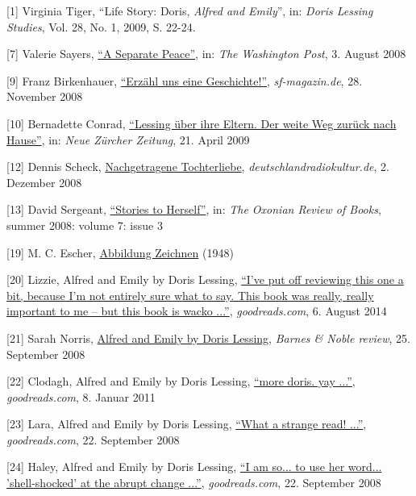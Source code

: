\documentclass[fontsize=12pt]{scrartcl}
\begin{document}
{\tiny[1] Virginia Tiger, "`Life Story: Doris, \textit{Alfred and Emily}"', in: \textit{Doris Lessing Studies}, Vol. 28, No. 1, 2009, S. 22-24.\par}
{\tiny[7] Valerie Sayers, \href{http://www.washingtonpost.com/wp-dyn/content/article/2008/07/31/AR2008073102585.html}{"`A Separate Peace"'}, in: \textit{The Washington Post}, 3. August 2008\par}
{\tiny[9] Franz Birkenhauer, \href{http://www.sf-magazin.de/doris-lessing-alfred-und-emily,117.html}{"`Erz\"ahl uns eine Geschichte!"'}, \textit{sf-magazin.de}, 28. November 2008\par}
{\tiny[10] Bernadette Conrad, \href{http://www.nzz.ch/aktuell/startseite/der-weite-weg-zurueck-nach-hause-1.2438185}{"`Lessing \"uber ihre Eltern. Der weite Weg zur\"uck nach Hause"'}, in: \textit{Neue Z\"urcher Zeitung}, 21. April 2009\par}
{\tiny[12] Dennis Scheck, \href{http://www.deutschlandradiokultur.de/nachgetragene-tochterliebe.950.de.html?dram:article_id=136885}{Nachgetragene Tochterliebe}, \textit{deutschlandradiokultur.de}, 2. Dezember 2008\par}
{\tiny[13] David Sergeant, \href{http://www.oxonianreview.org/wp/stories-to-herself/}{"`Stories to Herself"'}, in: \textit{The Oxonian Review of Books}, summer 2008: volume 7: issue 3\par}
{\tiny[19] M. C. Escher, \href{http://en.wikipedia.org/wiki/File:DrawingHands.jpg}{Abbildung Zeichnen} (1948)\par}
{\tiny[20] Lizzie, Alfred and Emily by Doris Lessing, \href{https://www.goodreads.com/review/show/445489394}{"`I've put off reviewing this one a bit, because I'm not entirely sure what to say. This book was really, really important to me -- but this book is wacko ..."'}, \textit{goodreads.com}, 6. August 2014\par}
{\tiny[21] Sarah Norris, \href{http://www.barnesandnoble.com/review/alfred-and-emily}{Alfred and Emily by Doris Lessing}, \textit{Barnes \& Noble review}, 25. September 2008\par}
{\tiny[22] Clodagh, Alfred and Emily by Doris Lessing, \href{https://www.goodreads.com/review/show/133541837}{"`more doris. yay ..."'}, \textit{goodreads.com}, 8. Januar 2011\par}
{\tiny[23] Lara, Alfred and Emily by Doris Lessing, \href{https://www.goodreads.com/review/show/31104294}{"`What a strange read! ..."'}, \textit{goodreads.com}, 22. September 2008\par}
{\tiny[24] Haley, Alfred and Emily by Doris Lessing, \href{https://www.goodreads.com/review/show/31104294?page=1\#comment_77325756}{"`I am so... to use her word... 'shell-shocked' at the abrupt change ..."'}, \textit{goodreads.com}, 22. September 2008\par}
\end{document}
